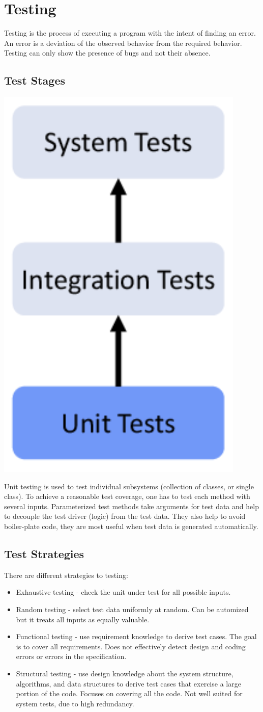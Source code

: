 \section{Testing}

Testing is the process of executing a program with the intent of finding an error. An error is a deviation of the observed behavior from the required behavior. Testing can only show the presence of bugs and not their absence.


\subsection{Test Stages}

\begin{center}
	\includegraphics[width=0.3\columnwidth]{assets/testing_stages}
\end{center}

Unit testing is used to test individual subsystems (collection of classes, or single class). To achieve a reasonable test coverage, one has to test each method with several inputs. Parameterized test methods take arguments for test data and help to decouple the test driver (logic) from the test data. They also help to avoid boiler-plate code, they are most useful when test data is generated automatically.


\subsection{Test Strategies}

There are different strategies to testing:
\begin{itemize}
	\item Exhaustive testing - check the unit under test for all possible inputs.
	\item Random testing - select test data uniformly at random. Can be automized but it treats all inputs as equally valuable.
	\item Functional testing - use requirement knowledge to derive test cases. The goal is to cover all requirements. Does not effectively detect design and coding errors or errors in the specification.
	\item Structural testing - use design knowledge about the system structure, algorithms, and data structures to derive test cases that exercise a large portion of the code. Focuses on covering all the code. Not well suited for system tests, due to high redundancy.
\end{itemize}

